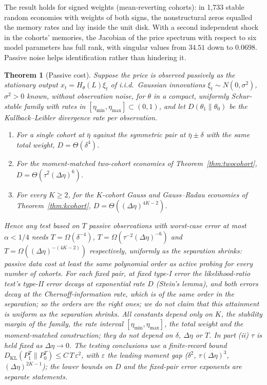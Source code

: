 \documentclass[12pt]{article}
\newtheorem{theorem}{Theorem}[section]
\theoremstyle{definition}
\theoremstyle{remark}
\newcommand{\KL}{D_{\mathrm{KL}}}
\begin{document}
The result holds for signed weights (mean-reverting cohorts): in 1,733 stable random economies with weights of both signs, the nonstructural zeros equalled the memory rates and lay inside the unit disk. With a second independent shock in the cohorts' memories, the Jacobian of the price spectrum with respect to six model parameters has full rank, with singular values from $34.51$ down to $0.0698$. Passive noise helps identification rather than hindering it.

\begin{theorem}[Passive cost]\label{prop:passive}
Suppose the price is observed passively as the stationary output $x_t=H_\theta(L)\xi_t$ of i.i.d.\ Gaussian innovations $\xi_t\sim N(0,\sigma^2)$, $\sigma^2>0$ known, without observation noise, for $\theta$ in a compact, uniformly Schur-stable family with rates in $[\eta_{\min},\eta_{\max}]\subset(0,1)$, and let $D(\theta_1\|\theta_0)$ be the Kullback--Leibler divergence rate per observation.
\begin{enumerate}[label=(\roman*)]
\item For a single cohort at $\bar\eta$ against the symmetric pair at $\bar\eta\pm\delta$ with the same total weight, $D=\Theta(\delta^4)$.
\item For the moment-matched two-cohort economies of Theorem~\ref{thm:twocohort}, $D=\Theta(\tau^2(\Delta\eta)^6)$.
\item For every $K\ge2$, for the $K$-cohort Gauss and Gauss--Radau economies of Theorem~\ref{thm:kcohort}, $D=\Theta((\Delta\eta)^{4K-2})$.
\end{enumerate}
Hence any test based on $T$ passive observations with worst-case error at most $\alpha<1/4$ needs $T=\Omega(\delta^{-4})$, $T=\Omega(\tau^{-2}(\Delta\eta)^{-6})$ and $T=\Omega((\Delta\eta)^{-(4K-2)})$ respectively, uniformly as the separation shrinks: passive data cost at least the same polynomial order as active probing for every number of cohorts. For each fixed pair, at fixed type-I error the likelihood-ratio test's type-II error decays at exponential rate $D$ (Stein's lemma), and both errors decay at the Chernoff-information rate, which is of the same order in the separation; so the orders are the right ones; we do not claim that this attainment is uniform as the separation shrinks. All constants depend only on $K$, the stability margin of the family, the rate interval $[\eta_{\min},\eta_{\max}]$, the total weight and the moment-matched construction; they do not depend on $\delta$, $\Delta\eta$ or $T$. In part (ii) $\tau$ is held fixed as $\Delta\eta\to0$. The testing conclusions use a finite-record bound $\KL(P_1^T\|P_0^T)\le C\,T\,\varepsilon^2$, with $\varepsilon$ the leading moment gap ($\delta^2$, $\tau(\Delta\eta)^3$, $(\Delta\eta)^{2K-1}$); the lower bounds on $D$ and the fixed-pair error exponents are separate statements.
\end{theorem}
\end{document}
